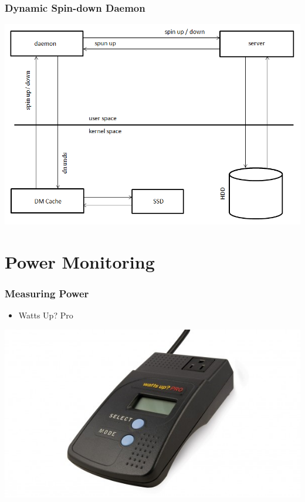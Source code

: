 \documentclass{beamer}
\begin{document}
\begin{frame}
  \frametitle{Dynamic Spin-down Daemon}

  \centering
  \includegraphics[height=0.8\textheight,keepaspectratio]{daemon.png}

\end{frame}

\section{Power Monitoring}

\begin{frame}
  \frametitle{Measuring Power}

  \begin{itemize}
    \item Watts Up? Pro
  \end{itemize}

  \vspace{\baselineskip}
  \centering
  \includegraphics[height=0.5\textheight,keepaspectratio]{wattsup.png}

\end{frame}
\end{document}
